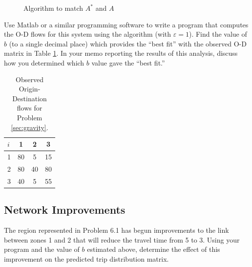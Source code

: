 \begin{figure}[h] 
\begin{centering}   
\caption{Algorithm to match $A^*$ and $A$}
\label{alg:attractions}
\end{centering}
\end{figure}

Use Matlab or a similar programming software to write a program that computes
the O-D flows for this system using the algorithm (with $\varepsilon=1$). Find
the value of $b$ (to a single decimal place) which provides the ``best fit''
with the observed O-D matrix in Table \ref{tab:ODmatrix}. In your memo reporting
the results of this analysis, discuss how you determined which $b$ value gave
the ``best fit.''

\begin{table}[h!]
  \caption{Observed Origin-Destination flows for Problem \ref{sec:gravity}.}
	\label{tab:ODmatrix}
\begin{center}
\begin{tabular}{l c c c}
\hline
$i$ & 1 & 2 & 3\\
\hline
1 & 80 & 5 & 15\\
2 & 80 & 40 & 80\\
3 & 40 & 5 & 55\\
\hline
\end{tabular}
\end{center}
\end{table}

\subsection{Network Improvements}
The region represented in Problem 6.1 has begun improvements to the link between
zones 1 and 2 that will reduce the travel time from 5 to 3. Using your program
and the value of $b$ estimated above, determine the effect of this improvement
on the predicted trip distribution matrix.

